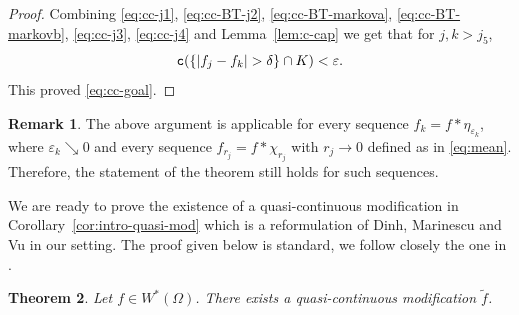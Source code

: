\documentclass{amsart}
\newcommand{\wt}[1]{\widetilde{#1}}
\newcommand{\veps}{\varepsilon}
\newcommand{\de}{\delta}
\newcommand{\tc}{{\tt c}}
\newcommand{\Om}{\Omega}
\newtheorem{thm}{Theorem}
\theoremstyle{definition}
\newtheorem{remark}[thm]{Remark}
\numberwithin{thm}{section}
\numberwithin{equation}{section}
\renewcommand{\[}{\begin{equation}}
\renewcommand{\]}{\end{equation}}
\begin{document}
\begin{proof}
Combining \eqref{eq:cc-j1}, \eqref{eq:cc-BT-j2}, \eqref{eq:cc-BT-markova}, \eqref{eq:cc-BT-markovb}, \eqref{eq:cc-j3},  \eqref{eq:cc-j4} and Lemma~\ref{lem:c-cap} we get that for $j, k>j_5$, $$\tc (\{|f_j-f_k|>\de\} \cap K) <\veps.$$ This proved  \eqref{eq:cc-goal}. 
\end{proof}

\begin{remark} \label{rmk:cauchy} The above argument is applicable for  every sequence  $f_k = f*\eta_{\veps_k}$, where  $\veps_k \searrow 0$ and every sequence $f_{r_j} = f * \chi_{r_j}$ with $r_j \to 0$ defined as in \eqref{eq:mean}. Therefore, the statement of the theorem still holds for such sequences.
\end{remark}

We are ready to prove the existence of a quasi-continuous modification in Corollary~\ref{cor:intro-quasi-mod} which  is a reformulation of Dinh, Marinescu and Vu \cite[Theorem~2.10]{DMV} in our setting. The proof given below is standard, we follow closely the one in  \cite[Theorem~2.13]{FOT94}.

\begin{thm} \label{thm:quasi-mod} Let  $f\in W^*(\Om)$. There exists a quasi-continuous modification $\wt f$.
\end{thm}
\end{document}
